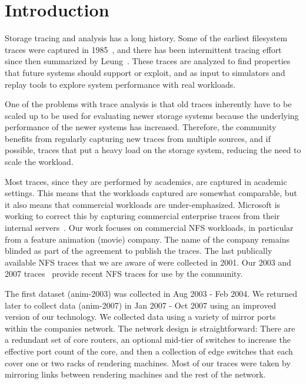 \section{Introduction}

Storage tracing and analysis has a long history.  Some of the earliest
filesystem traces were captured in 1985~\cite{ousterhout85}, and there
has been intermittent tracing effort since then summarized by
Leung~\cite{LeungUsenix08}.  These traces are
analyzed to find properties that future systems should support or
exploit, and as input to simulators and replay tools to explore system
performance with real workloads.

One of the problems
with trace analysis is that old traces inherently have to be scaled up
to be used for evaluating newer storage systems because the
underlying performance of the newer systems has increased.  Therefore,
the community benefits from regularly capturing new traces from multiple
sources, and if possible, traces that put a heavy load on the storage
system, reducing the need to scale the workload.

Most traces, since they are performed by academics, are captured in
academic settings.  This means that the workloads captured are
somewhat comparable, but it also means that commercial workloads are
under-emphasized.  Microsoft is working to correct this by capturing
commercial enterprise traces from their internal
servers~\cite{snia-iotta-microsoft}.  Our work focuses on commercial
NFS workloads, in particular from a feature animation (movie) company.
The name of the company remains blinded as part of the agreement to
publish the traces.  The last publically available NFS traces that we
are aware of were collected in 2001.  Our 2003 and 2007
traces~\cite{animation-bear-traces} provide recent NFS traces for use
by the community.

The first dataset (anim-2003) was collected in Aug 2003 - Feb 2004.  We
returned later to collect data (anim-2007) in Jan 2007 - Oct 2007 using an
improved version of our technology.  We collected data using a variety of mirror
ports within the companies network.
The network design is
straightforward: There are a redundant set of core routers, an
optional mid-tier of switches to increase the effective port count of
the core, and then a collection of edge switches that each cover one
or two racks of rendering machines.  Most of our traces were taken by
mirroring links between rendering machines and the rest of the network.


